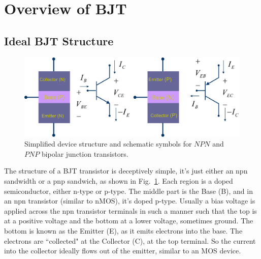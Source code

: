 \section{Overview of BJT}
\subsection{Ideal BJT Structure}
\begin{figure}[tb]
\begin{center}
\includegraphics[width=.85\columnwidth]{slide2_bjt_overview}
\end{center}
\caption{Simplified device structure and schematic symbols for $NPN$ and $PNP$ bipolar junction transistors.}
\label{fig:slide2_bjt_overview}
\end{figure}

The structure of a BJT transistor is deceptively simple, it's just either an npn sandwidth or a pnp sandwich, as shown in Fig.~\ref{fig:slide2_bjt_overview}.  Each region is a doped semiconductor, either n-type or p-type.  The middle part is the Base (B), and in an npn transistor (similar to nMOS), it's doped p-type.  Usually a bias voltage is applied across the npn transistor terminals in such a manner such that the top is at a positive voltage and the bottom at a lower voltage, sometimes ground.  The bottom is known as the Emitter (E), as it emits electrons into the base.  The electrons are ``collected" at the Collector (C), at the top terminal.  So the current into the collector ideally flows out of the emitter, similar to an MOS device.


